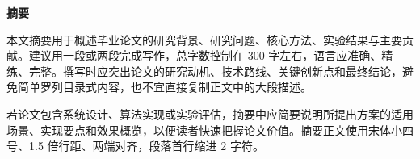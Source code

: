 \begin{center}
  {\heiti{}\bfseries 摘\qquad 要}
\end{center}

\vspace{1.5\baselineskip}

{\songti{}
本文摘要用于概述毕业论文的研究背景、研究问题、核心方法、实验结果与主要贡献。建议用一段或两段完成写作，总字数控制在 300 字左右，语言应准确、精练、完整。撰写时应突出论文的研究动机、技术路线、关键创新点和最终结论，避免简单罗列目录式内容，也不宜直接复制正文中的大段描述。

若论文包含系统设计、算法实现或实验评估，摘要中应简要说明所提出方案的适用场景、实现要点和效果概览，以便读者快速把握论文价值。摘要正文使用宋体小四号、1.5 倍行距、两端对齐，段落首行缩进 2 字符。
\par}

\vspace{\baselineskip}

